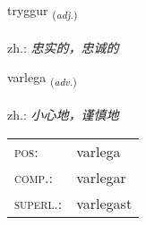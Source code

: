 \documentclass[frontgrid, backgrid]{flacards}\usepackage[]{graphicx}\usepackage[]{xcolor}
\begin{document}
\renewcommand{\flhead}{\vskip5pt \fboxsep=0pt {\small\bfseries\footnotesize Lýsingarorð | 形容词}}
\renewcommand{\fcfoot}{\vskip5pt \fboxsep=0pt \hspace{2pt}{\small\bfseries\footnotesize 3K}}

\renewcommand{\blhead}{\vskip5pt {\small\bfseries\footnotesize Lýsingarorð | 形容词 }}
\renewcommand{\bcfoot}{\vskip5pt \hspace{2pt}{\small\bfseries\footnotesize 3K}}


{tryggur \small{\textsubscript{(\textit{adj.})}} \\[1ex] %
\textphonetic{[tʰrɪkʏr]} \\
zh.: \emph{忠实的，忠诚的} \\  [2ex]
\renewcommand*{\arraystretch}{0.8}
}

\renewcommand{\flhead}{\vskip5pt \fboxsep=0pt {\small\bfseries\footnotesize Atviksorð | 副词}}
\renewcommand{\fcfoot}{\vskip5pt \fboxsep=0pt \hspace{2pt}{\small\bfseries\footnotesize 3K}}

\renewcommand{\blhead}{\vskip5pt {\small\bfseries\footnotesize Atviksorð | 副词 }}
\renewcommand{\bcfoot}{\vskip5pt \hspace{2pt}{\small\bfseries\footnotesize 3K}}


{varlega \small{\textsubscript{(\textit{adv.})}} \\[1ex] %
\textphonetic{[varlɛɣa]} \\
zh.: \emph{小心地，谨慎地} \\  [2ex]
\renewcommand*{\arraystretch}{0.8}
\begin{tabular}{ll}
\textsc{pos}: & varlega \\ 
\textsc{comp.}: & varlegar \\ 
\textsc{superl.}: & varlegast \\
\end{tabular}
}
\end{document}
